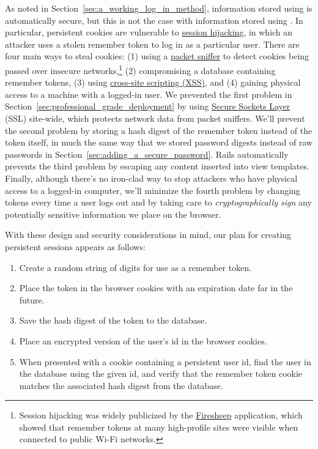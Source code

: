 As noted in Section~\ref{sec:a_working_log_in_method}, information stored using  is automatically secure, but this is not the case with information stored using . In particular, persistent cookies are vulnerable to \href{http://en.wikipedia.org/wiki/Session_hijacking}{session hijacking}, in which an attacker uses a stolen remember token to log in as a particular user. There are four main ways to steal cookies: (1) using a \href{https://en.wikipedia.org/wiki/Packet_analyzer}{packet sniffer} to detect cookies being passed over insecure networks,\footnote{Session hijacking was widely publicized by the \href{http://codebutler.com/firesheep}{Firesheep} application, which showed that remember tokens at many high-profile sites were visible when connected to public Wi-Fi networks.} (2) compromising a database containing remember tokens, (3) using \href{http://en.wikipedia.org/wiki/Cross-site_scripting}{cross-site scripting (XSS)}, and (4) gaining physical access to a machine with a logged-in user. We prevented the first problem in Section~\ref{sec:professional_grade_deployment} by using \href{https://en.wikipedia.org/wiki/Transport_Layer_Security}{Secure Sockets Layer} (SSL) site-wide, which protects network data from packet sniffers. We'll prevent the second problem by storing a hash digest of the remember token instead of the token itself, in much the same way that we stored password digests instead of raw passwords in Section~\ref{sec:adding_a_secure_password}. Rails automatically prevents the third problem by escaping any content inserted into view templates. Finally, although there's no iron-clad way to stop attackers who have physical access to a logged-in computer, we'll minimize the fourth problem by changing tokens every time a user logs out and by taking care to \emph{cryptographically sign} any potentially sensitive information we place on the browser.

With these design and security considerations in mind, our plan for creating persistent sessions appears as follows:

\begin{enumerate}
\item Create a random string of digits for use as a remember token.
\item Place the token in the browser cookies with an expiration date far in the future.
\item Save the hash digest of the token to the database.
\item Place an encrypted version of the user's id in the browser cookies.
\item When presented with a cookie containing a persistent user id, find the user in the database using the given id, and verify that the remember token cookie matches the associated hash digest from the database.
\end{enumerate}

